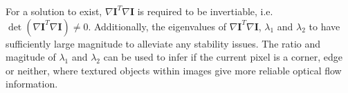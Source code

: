 For a solution to exist, $\nabla \mathbf{I}^{T} \nabla \mathbf{I}$ is required to be invertiable, i.e. $\det(\nabla \mathbf{I}^{T} \nabla \mathbf{I}) \ne 0$. Additionally, the eigenvalues of $\nabla \mathbf{I}^{T} \nabla \mathbf{I}$, $\lambda_1$ and $\lambda_2$ to have sufficiently large magnitude to alleviate any stability issues. The ratio and magitude of $\lambda_1$ and $\lambda_2$ can be used to infer if the current pixel is a corner, edge or neither, where textured objects within images give more reliable optical flow information. 





